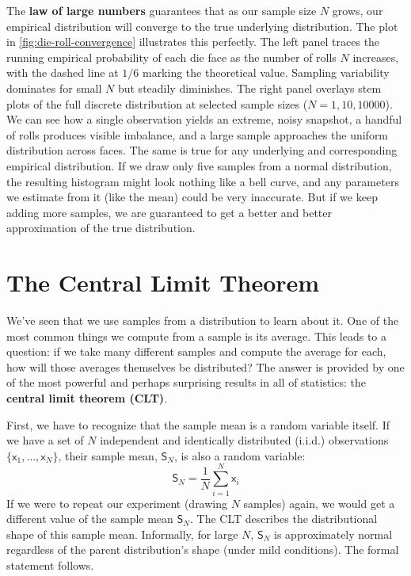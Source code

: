 The \textbf{law of large numbers} guarantees that as our sample size $N$ grows, our empirical distribution will converge to the true underlying distribution. The plot in \autoref{fig:die-roll-convergence} illustrates this perfectly. The left panel traces the running empirical probability of each die face as the number of rolls $N$ increases, with the dashed line at $1/6$ marking the theoretical value. Sampling variability dominates for small $N$ but steadily diminishes. The right panel overlays stem plots of the full discrete distribution at selected sample sizes ($N=1,10,10000$). We can see how a single observation yields an extreme, noisy snapshot, a handful of rolls produces visible imbalance, and a large sample approaches the uniform distribution across faces. The same is true for any underlying and corresponding empirical distribution. If we draw only five samples from a normal distribution, the resulting histogram might look nothing like a bell curve, and any parameters we estimate from it (like the mean) could be very inaccurate. But if we keep adding more samples, we are guaranteed to get a better and better approximation of the true distribution.

\section{The Central Limit Theorem}
We've seen that we use samples from a distribution to learn about it. One of the most common things we compute from a sample is its average. This leads to a question: if we take many different samples and compute the average for each, how will those averages themselves be distributed? The answer is provided by one of the most powerful and perhaps surprising results in all of statistics: the \textbf{central limit theorem (CLT)}.

First, we have to recognize that the sample mean is a random variable itself. If we have a set of $N$ independent and identically distributed (i.i.d.) observations $\{\mathsf{x}_1, \dots, \mathsf{x}_N\}$, their sample mean, $\mathsf{S}_N$, is also a random variable:
\begin{equation}
    \mathsf{S}_N = \frac{1}{N}\sum_{i=1}^N \mathsf{x}_i
\end{equation}
If we were to repeat our experiment (drawing $N$ samples) again, we would get a different value of the sample mean $\mathsf{S}_N$. The CLT describes the distributional shape of this sample mean. Informally, for large $N$, $\mathsf{S}_N$ is approximately normal regardless of the parent distribution's shape (under mild conditions). The formal statement follows.

